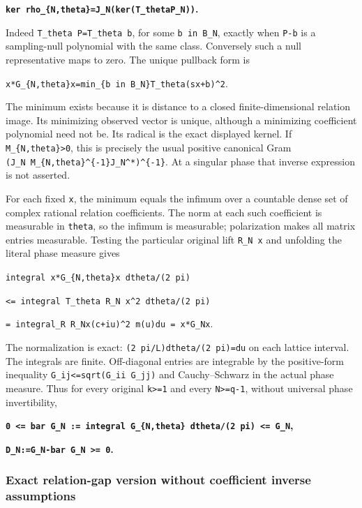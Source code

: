\textbf{\texttt{ker\ rho\_\{N,theta\}=J\_N(ker(T\_theta\textbar{}P\_N))}.}

Indeed \texttt{T\_theta\ P=T\_theta\ b}, for some \texttt{b\ in\ B\_N}, exactly when \texttt{P-b} is a sampling-null polynomial with the same class. Conversely such a null representative maps to zero. The unique pullback form is

\texttt{x*G\_\{N,theta\}x=min\_\{b\ in\ B\_N\}\textbar{}\textbar{}T\_theta(sx+b)\textbar{}\textbar{}\^{}2}.

The minimum exists because it is distance to a closed finite-dimensional relation image. Its minimizing observed vector is unique, although a minimizing coefficient polynomial need not be. Its radical is the exact displayed kernel. If \texttt{M\_\{N,theta\}\textgreater{}0}, this is precisely the usual positive canonical Gram \texttt{(J\_N\ M\_\{N,theta\}\^{}\{-1\}J\_N\^{}*)\^{}\{-1\}}. At a singular phase that inverse expression is not asserted.

For each fixed \texttt{x}, the minimum equals the infimum over a countable dense set of complex rational relation coefficients. The norm at each such coefficient is measurable in \texttt{theta}, so the infimum is measurable; polarization makes all matrix entries measurable. Testing the particular original lift \texttt{R\_N\ x} and unfolding the literal phase measure gives

\texttt{integral\ x*G\_\{N,theta\}x\ dtheta/(2\ pi)}

\texttt{\textless{}=\ integral\ \textbar{}\textbar{}T\_theta\ R\_N\ x\textbar{}\textbar{}\^{}2\ dtheta/(2\ pi)}

\texttt{=\ integral\_R\ \textbar{}R\_Nx(c+iu)\textbar{}\^{}2\ m(u)du\ =\ x*G\_Nx}.

The normalization is exact: \texttt{(2\ pi/L)dtheta/(2\ pi)=du} on each lattice interval. The integrals are finite. Off-diagonal entries are integrable by the positive-form inequality \texttt{\textbar{}G\_ij\textbar{}\textless{}=sqrt(G\_ii\ G\_jj)} and Cauchy--Schwarz in the actual phase measure. Thus for every original \texttt{k\textgreater{}=1} and every \texttt{N\textgreater{}=q-1}, without universal phase invertibility,

\textbf{\texttt{0\ \textless{}=\ bar\ G\_N\ :=\ integral\ G\_\{N,theta\}\ dtheta/(2\ pi)\ \textless{}=\ G\_N},}

\textbf{\texttt{D\_N:=G\_N-bar\ G\_N\ \textgreater{}=\ 0}.}

\subsubsection{Exact relation-gap version without coefficient inverse assumptions}\label{exact-relation-gap-version-without-coefficient-inverse-assumptions}


